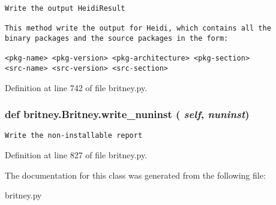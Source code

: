 \footnotesize\begin{verbatim}Write the output HeidiResult

This method write the output for Heidi, which contains all the
binary packages and the source packages in the form:

<pkg-name> <pkg-version> <pkg-architecture> <pkg-section>
<src-name> <src-version> <src-section>
\end{verbatim}
\normalsize
 

Definition at line 742 of file britney.py.
\subsubsection{\setlength{\rightskip}{0pt plus 5cm}def britney.Britney.write\_\-nuninst ( {\em self},  {\em nuninst})}\label{classbritney_1_1Britney_1dd8c704e1dab571e4bb62ae15f6ee52}




\footnotesize\begin{verbatim}Write the non-installable report\end{verbatim}
\normalsize
 

Definition at line 827 of file britney.py.

The documentation for this class was generated from the following file:\begin{CompactItemize}
\item 
britney.py\end{CompactItemize}

